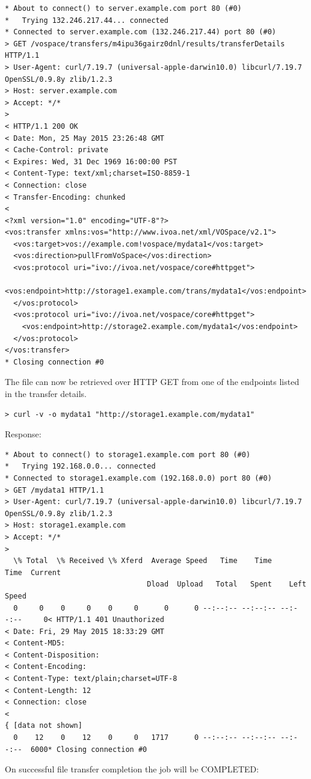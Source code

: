 \documentclass[11pt,a4paper]{ivoa}
\begin{document}
\begin{lstlisting}
* About to connect() to server.example.com port 80 (#0)
*   Trying 132.246.217.44... connected
* Connected to server.example.com (132.246.217.44) port 80 (#0)
> GET /vospace/transfers/m4ipu36gairz0dnl/results/transferDetails HTTP/1.1
> User-Agent: curl/7.19.7 (universal-apple-darwin10.0) libcurl/7.19.7 OpenSSL/0.9.8y zlib/1.2.3
> Host: server.example.com
> Accept: */*
>
< HTTP/1.1 200 OK
< Date: Mon, 25 May 2015 23:26:48 GMT
< Cache-Control: private
< Expires: Wed, 31 Dec 1969 16:00:00 PST
< Content-Type: text/xml;charset=ISO-8859-1
< Connection: close
< Transfer-Encoding: chunked
<
<?xml version="1.0" encoding="UTF-8"?>
<vos:transfer xmlns:vos="http://www.ivoa.net/xml/VOSpace/v2.1">
  <vos:target>vos://example.com!vospace/mydata1</vos:target>
  <vos:direction>pullFromVoSpace</vos:direction>
  <vos:protocol uri="ivo://ivoa.net/vospace/core#httpget">
    <vos:endpoint>http://storage1.example.com/trans/mydata1</vos:endpoint>
  </vos:protocol>
  <vos:protocol uri="ivo://ivoa.net/vospace/core#httpget">
    <vos:endpoint>http://storage2.example.com/mydata1</vos:endpoint>
  </vos:protocol>
</vos:transfer>
* Closing connection #0
\end{lstlisting}
The file can now be retrieved over HTTP GET from one of the endpoints listed in the transfer details.
\begin{lstlisting}
> curl -v -o mydata1 "http://storage1.example.com/mydata1"
\end{lstlisting}
Response:
\begin{lstlisting}
* About to connect() to storage1.example.com port 80 (#0)
*   Trying 192.168.0.0... connected
* Connected to storage1.example.com (192.168.0.0) port 80 (#0)
> GET /mydata1 HTTP/1.1
> User-Agent: curl/7.19.7 (universal-apple-darwin10.0) libcurl/7.19.7 OpenSSL/0.9.8y zlib/1.2.3
> Host: storage1.example.com
> Accept: */*
>
  \% Total  \% Received \% Xferd  Average Speed   Time    Time     Time  Current
                                 Dload  Upload   Total   Spent    Left  Speed
  0     0    0     0    0     0      0      0 --:--:-- --:--:-- --:--:--     0< HTTP/1.1 401 Unauthorized
< Date: Fri, 29 May 2015 18:33:29 GMT
< Content-MD5:
< Content-Disposition:
< Content-Encoding:
< Content-Type: text/plain;charset=UTF-8
< Content-Length: 12
< Connection: close
<
{ [data not shown]
  0    12    0    12    0     0   1717      0 --:--:-- --:--:-- --:--:--  6000* Closing connection #0
\end{lstlisting}
On successful file transfer completion the job will be COMPLETED:
\end{document}
